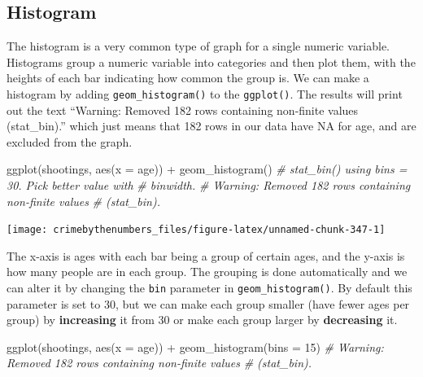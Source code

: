 \documentclass[
  a4paper,
]{krantz}
\makeatletter
\newenvironment{Shaded}{\begin{snugshade}}{\end{snugshade}}
\newcommand{\AttributeTok}[1]{\textcolor[rgb]{0.77,0.63,0.00}{#1}}
\newcommand{\CommentTok}[1]{\textcolor[rgb]{0.56,0.35,0.01}{\textit{#1}}}
\newcommand{\DecValTok}[1]{\textcolor[rgb]{0.00,0.00,0.81}{#1}}
\newcommand{\FunctionTok}[1]{\textcolor[rgb]{0.00,0.00,0.00}{#1}}
\newcommand{\NormalTok}[1]{#1}
\newcommand{\SpecialCharTok}[1]{\textcolor[rgb]{0.00,0.00,0.00}{#1}}
\newenvironment{kframe}{%
\medskip{}
\setlength{\fboxsep}{.8em}
 \def\at@end@of@kframe{}%
 \ifinner\ifhmode%
  \def\at@end@of@kframe{\end{minipage}}%
  \begin{minipage}{\columnwidth}%
 \fi\fi%
 \def\FrameCommand##1{\hskip\@totalleftmargin \hskip-\fboxsep
 \colorbox{shadecolor}{##1}\hskip-\fboxsep
     \hskip-\linewidth \hskip-\@totalleftmargin \hskip\columnwidth}%
 \MakeFramed {\advance\hsize-\width
   \@totalleftmargin\z@ \linewidth\hsize
   \@setminipage}}%
 {\par\unskip\endMakeFramed%
 \at@end@of@kframe}
\renewenvironment{Shaded}{\begin{kframe}}{\end{kframe}}
\makeatother
\begin{document}
\hypertarget{histogram}{%
\subsection{Histogram}\label{histogram}}

The histogram is a very common type of graph for a single
numeric variable. Histograms group a numeric variable into
categories and then plot them, with the heights of each bar
indicating how common the group is. We can make a histogram
by adding \texttt{geom\_histogram()} to the
\texttt{ggplot()}. The results will print out the text
``Warning: Removed 182 rows containing non-finite values
(stat\_bin).'' which just means that 182 rows in our data
have NA for age, and are excluded from the graph.

\begin{Shaded}
\begin{Highlighting}[]
\FunctionTok{ggplot}\NormalTok{(shootings, }\FunctionTok{aes}\NormalTok{(}\AttributeTok{x =}\NormalTok{ age)) }\SpecialCharTok{+}
  \FunctionTok{geom\_histogram}\NormalTok{()}
\CommentTok{\# \textasciigrave{}stat\_bin()\textasciigrave{} using \textasciigrave{}bins = 30\textasciigrave{}. Pick better value with}
\CommentTok{\# \textasciigrave{}binwidth\textasciigrave{}.}
\CommentTok{\# Warning: Removed 182 rows containing non{-}finite values}
\CommentTok{\# (stat\_bin).}
\end{Highlighting}
\end{Shaded}

\begin{center}\texttt{[image: crimebythenumbers\_files/figure-latex/unnamed-chunk-347-1]} \end{center}

The x-axis is ages with each bar being a group of certain
ages, and the y-axis is how many people are in each group.
The grouping is done automatically and we can alter it by
changing the \texttt{bin} parameter in
\texttt{geom\_histogram()}. By default this parameter is set
to 30, but we can make each group smaller (have fewer ages
per group) by \textbf{increasing} it from 30 or make each
group larger by \textbf{decreasing} it.

\begin{Shaded}
\begin{Highlighting}[]
\FunctionTok{ggplot}\NormalTok{(shootings, }\FunctionTok{aes}\NormalTok{(}\AttributeTok{x =}\NormalTok{ age)) }\SpecialCharTok{+}
  \FunctionTok{geom\_histogram}\NormalTok{(}\AttributeTok{bins =} \DecValTok{15}\NormalTok{)}
\CommentTok{\# Warning: Removed 182 rows containing non{-}finite values}
\CommentTok{\# (stat\_bin).}
\end{Highlighting}
\end{Shaded}
\end{document}
